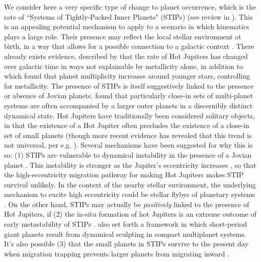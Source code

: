 \documentclass[twocolumn]{aastex631}
\begin{document}
 We consider here a very specific type of change to planet occurrence, which is the rate of ``Systems of Tightly-Packed Inner Planets" (STIPs) (see review in \citealt{ford_architectures_2014}). This is an appealing potential mechanism to apply to a scenario in which kinematics plays a large role. Their presence may reflect the local stellar environment at birth, in a way that allows for a possible connection to a galactic context \citep{winter_stellar_2020}. There already exists evidence, described by \cite{miyazaki_evidence_2023} that the rate of Hot Jupiters has changed over galactic time in ways not explainable by metallicity alone, in addition to which \cite{yang_planets_2023} found that planet multiplicity increases around younger stars, controlling for metallicity. The presence of STIPs is itself suggestively linked to the presence or absence of Jovian planets. \cite{Becker20_USP} found that particularly close-in sets of multi-planet systems are often accompanied by a larger outer planets in a  discernibly distinct dynamical state. Hot Jupiters have traditionally been considered solitary objects, in that the existence of a Hot Jupiter often precludes the existence of a close-in set of small planets \citep{wright_ten_2009, steffen_kepler_2012, huang_warm_2016, hord_uniform_2021, wang_transiting_2021, ivshina_tess_2022} (though more recent evidence has revealed that this trend is not universal, per e.g. \citealt{Becker15, wu_evidence_2023}). Several mechanisms have been suggested for why this is so: (1) STIPs are vulnerable to dynamical instability in the presence of a Jovian planet \citep{Becker17, hansen_perturbation_2017, granados_contreras_dynamics_2018}. This instability is stronger as the Jupiter's eccentricity increases \citep{Denham19}, so that the high-eccentricity migration pathway for making Hot Jupiters \citep{rasio_dynamical_1996, Chatterjee08, weidenschilling_gravitational_1996, wu_planet_2003, Fabrycky07b} makes STIP survival unlikely. In the context of the nearby stellar environment, the underlying mechanism to excite high eccentricity could be stellar flybys of planetary systems \citep{wang_hot_2020, wang_transiting_2021, rodet_correlation_2021}. On the other hand, STIPs may actually be \textit{positively} linked to the presence of Hot Jupiters, if (2) the in-situ formation of hot Jupiters is an extreme outcome of early metastability of STIPs \citep{boley_situ_2016}. \cite{wu_evidence_2023} also set forth a framework in which short-period giant planets result from dynamical sculpting in compact multiplanet systems. It's also possible (3) that the small planets in STIPs survive to the present day when migration trapping prevents larger planets from migrating inward \citep{zawadzki_migration_2022}. %
 
\end{document}
